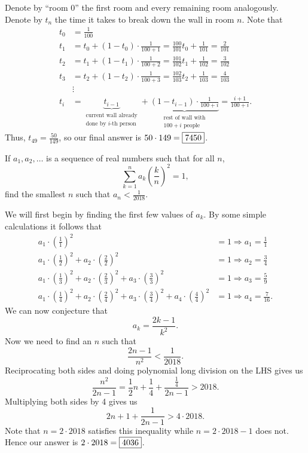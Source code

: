 \documentclass[letterpaper,oneside]{scrartcl}
\begin{document}
\begin{soln}
  Denote by ``room 0'' the first room and every remaining room analogously. Denote by \(t_n\) the time it takes to break down the wall in room \(n\). Note that 
  \begin{align*}
    t_0 &= \frac{1}{100} \\
    t_1 &= t_0 + (1-t_0)\cdot\frac{1}{100+1} = \frac{100}{101}t_0+\frac{1}{101} = \frac{2}{101}\\
    t_2 &= t_1 + (1-t_1)\cdot\frac{1}{100+2} = \frac{101}{102}t_1+\frac{1}{102} = \frac{3}{102}\\
    t_3 &= t_2 + (1-t_2)\cdot\frac{1}{100+3} = \frac{102}{103}t_2+\frac{1}{103} = \frac{4}{103}\\
    &\vdots \\
    t_i &= \underbrace{t_{i-1}}_{\substack{\text{current wall already}\\\text{done by } i\text{-th person}}} + \underbrace{(1-t_{i-1})\cdot\frac{1}{100+i}}_{\substack{\text{rest of wall with}\\100 + i \text{ people}}} = \frac{i+1}{100+i}. 
  \end{align*}
  Thus, \(t_{49} = \frac{50}{149}\), so our final answer is \(50\cdot149 = \fbox{7450}\).
\end{soln}
\begin{problem*}
  If \(a_1,a_2,\dots\) is a sequence of real numbers such that for all \(n\), \[\sum_{k=1}^n a_k\left(\frac{k}{n}\right)^2=1,\] find the smallest \(n\) such that \(a_n < \frac{1}{2018}\).
\end{problem*}
\begin{soln}
  We will first begin by finding the first few values of \(a_k\). By some simple calculations it follows that
  \begin{align*}
    a_1\cdot\left(\tfrac{1}{1}\right)^2&= 1 \Longrightarrow a_1 = \tfrac{1}{1}\\
    a_1\cdot\left(\tfrac{1}{2}\right)^2+a_2\cdot\left(\tfrac{2}{2}\right)^2&= 1 \Longrightarrow a_2 = \tfrac{3}{4}\\
    a_1\cdot\left(\tfrac{1}{3}\right)^2+a_2\cdot\left(\tfrac{2}{3}\right)^2+a_3\cdot\left(\tfrac{3}{3}\right)^2 &= 1 \Longrightarrow a_3 = \tfrac{5}{9}\\
    a_1\cdot\left(\tfrac{1}{4}\right)^2+a_2\cdot\left(\tfrac{2}{4}\right)^2+a_3\cdot\left(\tfrac{3}{4}\right)^2 + a_4\cdot\left(\tfrac{4}{4}\right)^2&= 1 \Longrightarrow a_4 = \tfrac{7}{16}.
  \end{align*}
  We can now conjecture that
  \[a_k = \frac{2k-1}{k^2}.\]
  Now we need to find an \(n\) such that
  \[\frac{2n-1}{n^2}<\frac{1}{2018}.\]
  Reciprocating both sides and doing polynomial long division on the LHS gives us
  \[\frac{n^2}{2n-1} = \frac{1}{2}n+\frac{1}{4}+\frac{\tfrac14}{2n-1}>2018.\]
  Multiplying both sides by 4 gives us 
  \[2n+1+\frac{1}{2n-1}>4\cdot2018.\]
  Note that \(n=2\cdot2018\) satisfies this inequality while \(n=2\cdot2018-1\) does not. Hence our answer is \(2\cdot2018 = \fbox{4036}\).
\end{soln}
\end{document}
